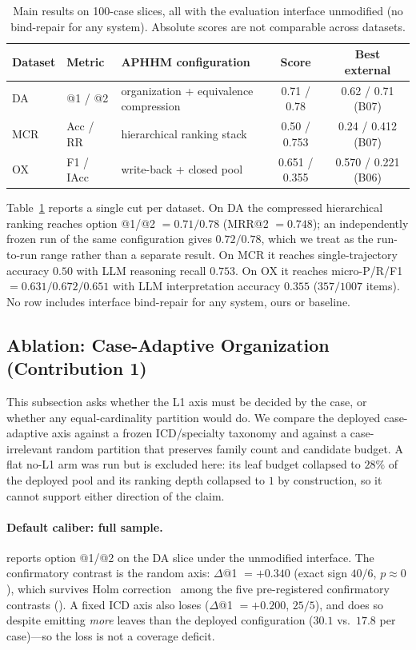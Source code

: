 \begin{table}[t]
\centering
\small
\caption{Main results on 100-case slices, all with the evaluation interface unmodified (no bind-repair for any system). Absolute scores are not comparable across datasets.}
\label{tab:main}
\begin{tabular}{llp{3.4cm}cc}
\toprule
Dataset & Metric & APHHM configuration & Score & Best external \\
\midrule
DA & @1 / @2 & organization + equivalence compression & 0.71 / 0.78 & 0.62 / 0.71 (B07) \\
MCR & Acc / RR & hierarchical ranking stack & 0.50 / 0.753 & 0.24 / 0.412 (B07) \\
OX & F1 / IAcc & write-back + closed pool & 0.651 / 0.355 & 0.570 / 0.221 (B06) \\
\bottomrule
\end{tabular}
\end{table}

Table~\ref{tab:main} reports a single cut per dataset.
On DA the compressed hierarchical ranking reaches option @1/@2 $=0.71/0.78$ (MRR@2 $=0.748$); an independently frozen run of the same configuration gives $0.72/0.78$, which we treat as the run-to-run range rather than a separate result.
On MCR it reaches single-trajectory accuracy $0.50$ with LLM reasoning recall $0.753$.
On OX it reaches micro-P/R/F1 $=0.631/0.672/0.651$ with LLM interpretation accuracy $0.355$ ($357/1007$ items).
No row includes interface bind-repair for any system, ours or baseline.

\subsection{Ablation: Case-Adaptive Organization (Contribution 1)}
\label{sec:res-org}

This subsection asks whether the L1 axis must be decided by the case, or whether any equal-cardinality partition would do.
We compare the deployed case-adaptive axis against a frozen ICD/specialty taxonomy and against a case-irrelevant random partition that preserves family count and candidate budget.
A flat no-L1 arm was run but is excluded here: its leaf budget collapsed to $28\%$ of the deployed pool and its ranking depth collapsed to $1$ by construction, so it cannot support either direction of the claim.

\paragraph{Default caliber: full sample.}
 reports option @1/@2 on the DA slice under the unmodified interface.
The confirmatory contrast is the random axis: $\Delta$@1 ${=}{+}0.340$ (exact sign $40/6$, $p{\approx}0$), which survives Holm correction~\cite{holm1979} among the five pre-registered confirmatory contrasts ().
A fixed ICD axis also loses ($\Delta$@1 ${=}{+}0.200$, $25/5$), and does so despite emitting \emph{more} leaves than the deployed configuration ($30.1$ vs.\ $17.8$ per case)---so the loss is not a coverage deficit.

